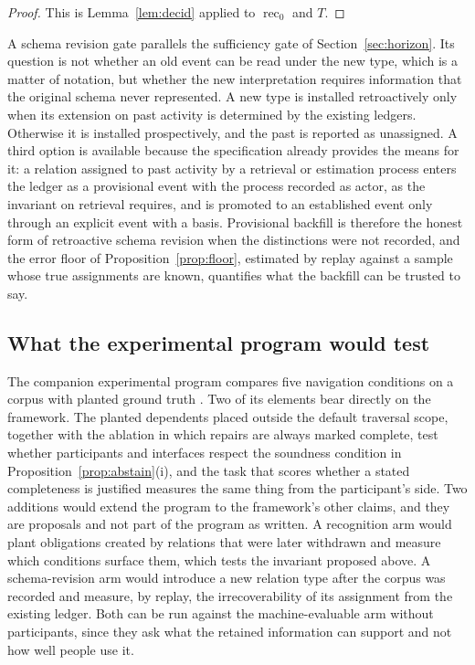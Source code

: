\documentclass[11pt]{article}
\theoremstyle{definition}
\theoremstyle{remark}
\begin{document}
\begin{proof}
This is Lemma~\ref{lem:decid} applied to $\operatorname{rec}_0$ and $T$.
\end{proof}

A schema revision gate parallels the sufficiency gate of Section~\ref{sec:horizon}. Its question is not whether an old event can be read under the new type, which is a matter of notation, but whether the new interpretation requires information that the original schema never represented. A new type is installed retroactively only when its extension on past activity is determined by the existing ledgers. Otherwise it is installed prospectively, and the past is reported as unassigned. A third option is available because the specification already provides the means for it: a relation assigned to past activity by a retrieval or estimation process enters the ledger as a provisional event with the process recorded as actor, as the invariant on retrieval requires, and is promoted to an established event only through an explicit event with a basis. Provisional backfill is therefore the honest form of retroactive schema revision when the distinctions were not recorded, and the error floor of Proposition~\ref{prop:floor}, estimated by replay against a sample whose true assignments are known, quantifies what the backfill can be trusted to say.

\subsection{What the experimental program would test}

The companion experimental program compares five navigation conditions on a corpus with planted ground truth \cite{csnav}. Two of its elements bear directly on the framework. The planted dependents placed outside the default traversal scope, together with the ablation in which repairs are always marked complete, test whether participants and interfaces respect the soundness condition in Proposition~\ref{prop:abstain}(i), and the task that scores whether a stated completeness is justified measures the same thing from the participant's side. Two additions would extend the program to the framework's other claims, and they are proposals and not part of the program as written. A recognition arm would plant obligations created by relations that were later withdrawn and measure which conditions surface them, which tests the invariant proposed above. A schema-revision arm would introduce a new relation type after the corpus was recorded and measure, by replay, the irrecoverability of its assignment from the existing ledger. Both can be run against the machine-evaluable arm without participants, since they ask what the retained information can support and not how well people use it.
\end{document}

